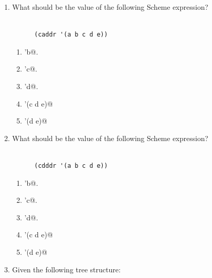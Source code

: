 \documentclass[12pt]{article}
\begin{document}
\begin{enumerate}
\begin{enumerate}
\end{enumerate}

\item What should be the value of the following Scheme expression?

\begin{verbatim}

      (caddr '(a b c d e))

\end{verbatim}

\begin{enumerate}

  \item \verb@'b@.

  \item \verb@'c@.
    
  \item \verb@'d@.

  \item \verb@'(c d e)@

  \item \verb@'(d e)@
    
    
\end{enumerate}

\newpage

\item What should be the value of the following Scheme expression?

\begin{verbatim}

      (cdddr '(a b c d e))

\end{verbatim}

\begin{enumerate}

  \item \verb@'b@.

  \item \verb@'c@.
    
  \item \verb@'d@.

  \item \verb@'(c d e)@

  \item \verb@'(d e)@
    
\end{enumerate}
    
\newpage



\item Given the following tree structure:


\end{enumerate}
\end{document}
